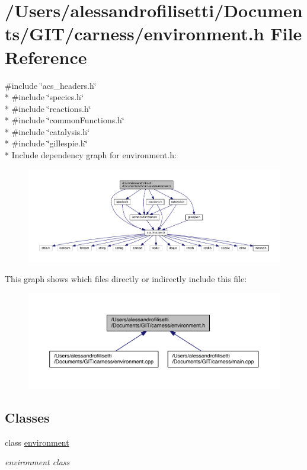 \hypertarget{a00086}{\section{/\-Users/alessandrofilisetti/\-Documents/\-G\-I\-T/carness/environment.h File Reference}
\label{a00086}
}
{\ttfamily \#include \char`\"{}acs\-\_\-headers.\-h\char`\"{}}\\*
{\ttfamily \#include \char`\"{}species.\-h\char`\"{}}\\*
{\ttfamily \#include \char`\"{}reactions.\-h\char`\"{}}\\*
{\ttfamily \#include \char`\"{}common\-Functions.\-h\char`\"{}}\\*
{\ttfamily \#include \char`\"{}catalysis.\-h\char`\"{}}\\*
{\ttfamily \#include \char`\"{}gillespie.\-h\char`\"{}}\\*
Include dependency graph for environment.\-h\-:\nopagebreak
\begin{figure}[H]
\begin{center}
\leavevmode
\includegraphics[width=350pt]{a00133}
\end{center}
\end{figure}
This graph shows which files directly or indirectly include this file\-:\nopagebreak
\begin{figure}[H]
\begin{center}
\leavevmode
\includegraphics[width=350pt]{a00134}
\end{center}
\end{figure}
\subsection*{Classes}
\begin{DoxyCompactItemize}
\item 
class \hyperlink{a00014}{environment}
\begin{DoxyCompactList}\small\item\em environment class \end{DoxyCompactList}\end{DoxyCompactItemize}
